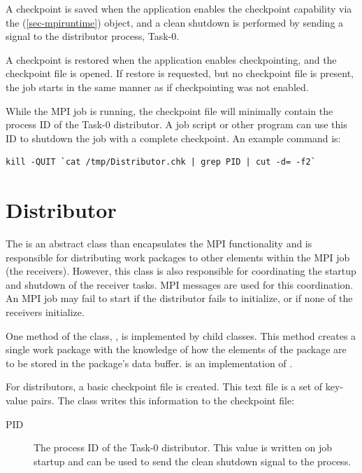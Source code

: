 A checkpoint is saved when the application enables the checkpoint capability via
the  (\ref{sec-mpiruntime}) object, and a clean shutdown is
performed by sending a signal to the distributor process, Task-0.

A checkpoint is restored when the application enables checkpointing, and the
checkpoint file is opened. If restore is requested, but no checkpoint file is
present, the job starts in the same manner as if checkpointing was not enabled.

While the MPI job is running, the checkpoint file will minimally contain the
process ID of the Task-0 distributor. A job script or other program can use
this ID to shutdown the job with a complete checkpoint. An example command is:
\begin{verbatim}
kill -QUIT `cat /tmp/Distributor.chk | grep PID | cut -d= -f2`
\end{verbatim}

\section{Distributor}
\label{sec-workpackagedistributor}

The  is an abstract class than encapsulates the MPI
functionality and is responsible for distributing work packages to other
elements within the MPI job (the receivers). However, this class
is also responsible for coordinating the startup and shutdown of the receiver
tasks. MPI messages are used for this coordination. An MPI job may fail to
start if the distributor fails to initialize, or if none of the receivers
initialize.

One method of the  class, ,
is implemented by child classes. This method creates a single work package
with the knowledge of how the elements of the package are to be stored
in the package's data buffer.  is an
implementation of .

For distributors, a basic checkpoint file is created. This text file is a
set of key-value pairs.
The  class writes this information to the checkpoint file:
\begin{description}
\item[PID] The process ID of the Task-0 distributor. This value is written on
job startup and can be used to send the clean shutdown signal to the process.
\end{description}

